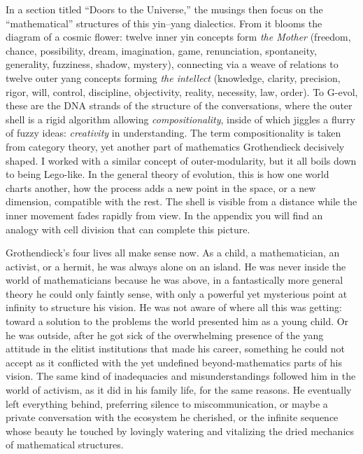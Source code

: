 \documentclass[11pt]{article}
\begin{document}
In a section titled ``Doors to the Universe,'' the musings then focus on the
``mathematical'' structures of this yin--yang dialectics. From it blooms the
diagram of a cosmic flower: twelve inner yin concepts form \emph{the Mother}
(freedom, chance, possibility, dream, imagination, game, renunciation,
spontaneity, generality, fuzziness, shadow, mystery), connecting via a weave of
relations to twelve outer yang concepts forming \emph{the intellect} (knowledge,
clarity, precision, rigor, will, control, discipline, objectivity, reality,
necessity, law, order). To G-evol, these are the DNA strands of the structure
of the conversations, where the outer shell is a rigid algorithm allowing
\emph{compositionality}, inside of which jiggles a flurry of fuzzy ideas:
\emph{creativity} in understanding. The term compositionality is taken from
category theory, yet another part of mathematics Grothendieck decisively
shaped. I worked with a similar concept of outer-modularity, but it all boils
down to being Lego-like. In the general theory of evolution, this is how one
world charts another, how the process adds a new point in the space, or a new
dimension, compatible with the rest. The shell is visible from a distance while
the inner movement fades rapidly from view. In the appendix you will find an
analogy with cell division that can complete this picture.

Grothendieck's four lives all make sense now. As a child, a mathematician, an
activist, or a hermit, he was always alone on an island. He was never inside
the world of mathematicians because he was above, in a fantastically more
general theory he could only faintly sense, with only a powerful yet mysterious
point at infinity to structure his vision. He was not aware of where all this
was getting: toward a solution to the problems the world presented him as a
young child. Or he was outside, after he got sick of the overwhelming presence
of the yang attitude in the elitist institutions that made his career,
something he could not accept as it conflicted with the yet undefined
beyond-mathematics parts of his vision. The same kind of inadequacies and
misunderstandings followed him in the world of activism, as it did in his
family life, for the same reasons. He eventually left everything behind,
preferring silence to miscommunication, or maybe a private conversation with
the ecosystem he cherished, or the infinite sequence whose beauty he touched by
lovingly watering and vitalizing the dried mechanics of mathematical
structures.
\end{document}
